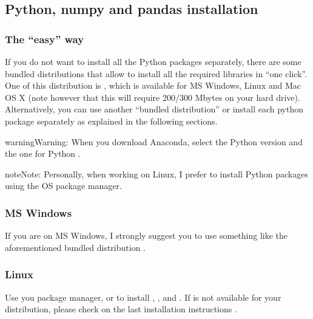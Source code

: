 \documentclass[letterpaper,10pt,english]{sphinxmanual}
\begin{document}
\subsection{Python, numpy and pandas installation}
\label{\detokenize{installation:python-numpy-and-pandas-installation}}

\subsubsection{The “easy” way}
\label{\detokenize{installation:the-easy-way}}
If you do not want to install all the Python packages separately,
there are some bundled distributions that allow to install all the
required libraries in “one click”. One of this distribution is
, which is
available for MS Windows, Linux and Mac OS X (note however that this
will require 200/300 Mbytes on your hard drive). Alternatively, you
can use another “bundled distribution” or install each python package
separately as explained in the following sections.

\begin{sphinxadmonition}{warning}{Warning:}
When you download Anaconda, select the Python 
version and  the one for Python .
\end{sphinxadmonition}

\begin{sphinxadmonition}{note}{Note:}
Personally, when working on Linux, I prefer to install Python packages
using the OS package manager.
\end{sphinxadmonition}


\subsubsection{MS Windows}
\label{\detokenize{installation:ms-windows}}
If you are on MS Windows, I strongly suggest you to use something like
the aforementioned bundled distribution .


\subsubsection{Linux}
\label{\detokenize{installation:linux}}
Use you package manager, or  to install
, ,  and
.  If  is not available for your
distribution, please check on the last installation instructions .
\end{document}
